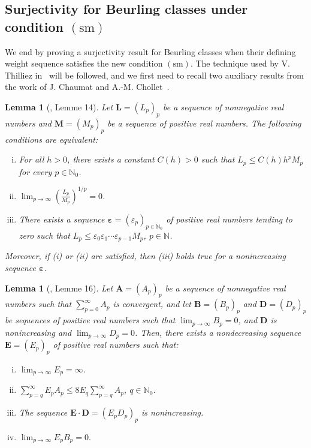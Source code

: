 \documentclass[11pt,a4paper]{article}
\theoremstyle{plain}
\newtheorem{lemma}[theorem]{Lemma}
\theoremstyle{definition}
\numberwithin{equation}{section}
\newcommand{\N}{\mathbb{N}}
\newcommand{\M}{{\boldsymbol{M}}}
\newcommand{\LL}{{\boldsymbol{L}}}
\newcommand{\bbepsilon}{{\boldsymbol{\varepsilon}}}
\newcommand{\sm}{\operatorname{(sm)}}
\begin{document}
\subsection{Surjectivity for Beurling classes under condition $\sm$}

We end by proving a surjectivity result for Beurling classes when their defining weight sequence satisfies the new condition $\sm$. The technique used by V. Thilliez in~\cite[Th. 3.4.1]{Thilliez03} will be followed, and we first need to recall two auxiliary results from the work of J. Chaumat and A.-M. Chollet~\cite{chaucho}.

\begin{lemma}[\cite{chaucho}, Lemme 14]\label{lemma-ChauCho-Beurlingsucesiones} Let $\LL=(L_p)_p$ be a sequence of nonnegative real numbers and $\M=(M_p)_p$ be a sequence of positive real numbers. The following conditions are equivalent:
	\begin{enumerate}[(i)]
		\item For all $h>0$, there exists a constant $C(h)>0$ such that $L_p\leq C(h) h^p M_p$ for every $p\in\N_0$.
		\item $\displaystyle\lim_{p\to\infty}\left(\frac{L_p}{M_p}\right)^{1/p}=0$.
		\item There exists a sequence $\bbepsilon=(\varepsilon_p)_{p\in\N_0}$ of positive real numbers tending to zero such that $L_p\leq \varepsilon_0\varepsilon_1\cdots \varepsilon_{p-1} M_p$, $p\in\N$.
	\end{enumerate}
	Moreover, if (i) or (ii) are satisfied, then (iii) holds true for a nonincreasing sequence $\bbepsilon$.
\end{lemma}

\begin{lemma}[\cite{chaucho}, Lemme 16]\label{lemma-Chaucho-3sucesiones}
Let $\boldsymbol{A}=(A_p)_p$ be a sequence of nonnegative real numbers such that $\sum_{p=0}^{\infty} A_p$ is convergent, and let $\boldsymbol{B}=(B_p)_p$ and $\boldsymbol{D}=(D_p)_p$ be sequences of positive real numbers such that $\lim_{p\to\infty}B_p=0$, and $\boldsymbol{D}$ is nonincreasing and $\lim_{p\to\infty}D_p=0$. Then, there exists a nondecreasing sequence $\boldsymbol{E}=(E_p)_p$ of positive real numbers such that:
	\begin{enumerate}[(i)]
		\item $\lim_{p\to\infty}E_p=\infty$.
		\item $%
\sum_{p=q}^{\infty}E_pA_p\leq 8 E_q \sum_{p=q}^{\infty}A_p$, $q\in\N_0$.
		\item The sequence $\boldsymbol{E}\cdot\boldsymbol{D}=(E_pD_p)_p$ is nonincreasing.
		\item $\lim_{p\to\infty}E_pB_p=0.$
	\end{enumerate}
\end{lemma}
\end{document}

